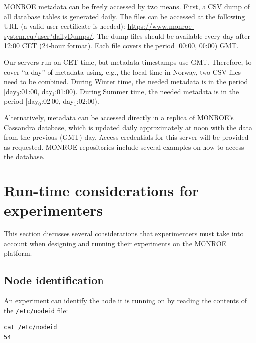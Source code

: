 \documentclass[a4paper,10pt]{article}
\newcommand{\VerbatimFont}{\footnotesize}
\newcommand{\monroe}{MONROE}
\newcommand{\identifier}[1]{{\texttt{\small{#1}}}}
\begin{document}
\monroe{} metadata can be freely accessed by two means.
First, a CSV dump of all database tables is generated daily.
The files can be accessed at the following URL (a valid user certificate is needed): \url{https://www.monroe-system.eu/user/dailyDumps/}.
The dump files should be available every day after 12:00 CET (24-hour format).
Each file covers the period [00:00, 00:00) GMT.

Our servers run on CET time, but metadata timestamps use GMT.
Therefore, to cover ``a day'' of metadata using, e.g., the local time in Norway, two CSV files need to be combined.
During Winter time, the needed metadata is in the period [day$_0$:01:00, day$_1$:01:00).
During Summer time, the needed metadata is in the period [day$_0$:02:00, day$_1$:02:00).

Alternatively, metadata can be accessed directly in a replica of \monroe{}'s Cassandra database, which is updated daily approximately at noon with the data from the previous (GMT) day.
Access credentials for this server will be provided as requested.
\monroe{} repositories include several examples on how to access the database.



\section{Run-time considerations for experimenters}
\label{sec:experimentRuntime}

This section discusses several considerations that experimenters must take into account when designing and running their experiments on the \monroe{} platform.

\subsection{Node identification}
\label{subsec:nodeIdentification}

An experiment can identify the node it is running on by reading the contents of the \identifier{/etc/nodeid} file:
{\VerbatimFont
\begin{verbatim}
cat /etc/nodeid
54
\end{verbatim}}

\end{document}
